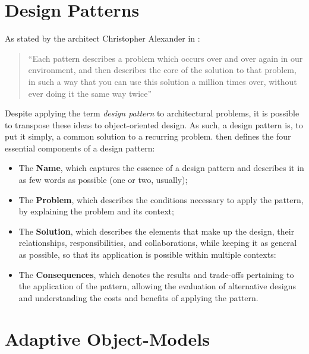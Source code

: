 \section{Design Patterns}\label{sec:design_patterns}

As stated by the architect Christopher Alexander in \cite{christopher_alexander_a_pattern_language}:

\begin{quote}
  ``Each pattern describes a problem which occurs over and over again in our environment, and then describes the core of the solution to that problem, in such a way that you can use this solution a million times over, without ever doing it the same way twice''
\end{quote}

Despite applying the term \emph{design pattern} to architectural problems, it is possible to transpose these ideas to object-oriented design. As such, a design pattern is, to put it simply, a common solution to a recurring problem. \cite{gang_of_four} then defines the four essential components of a design pattern:

\begin{itemize}
  \item The \textbf{Name}, which captures the essence of a design pattern and describes it in as few words as possible (one or two, usually); \\
  \item The \textbf{Problem}, which describes the conditions necessary to apply the pattern, by explaining the problem and its context; \\
  \item The \textbf{Solution}, which describes the elements that make up the design, their relationships, responsibilities, and collaborations, while keeping it as general as possible, so that its application is possible within multiple contexts: \\
  \item The \textbf{Consequences}, which denotes the results and trade-offs pertaining to the application of the pattern, allowing the evaluation of alternative designs and understanding the costs and benefits of applying the pattern. \\
\end{itemize}

\section{Adaptive Object-Models}\label{sec:aom}

